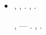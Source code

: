 \documentclass[a4paper]{article}
\begin{document}
\begin{itemize}
{{\cyrp}{\cyri}{\cyrk}{\cyrs}{\cyre}{\cyrl}{\cyrsftsn}}
\item {
{\CYRE}{\cyrs}{\cyrl}{\cyri} {\cyrp}{\cyro}{\cyrm}{\cyre}{\cyrch}{\cyre}{\cyrn} {\cyri}
{\cyrl}{\cyre}{\cyrv}{\cyrery}{\cyrishrt} {\cyri} {\cyrv}{\cyre}{\cyrr}{\cyrh}{\cyrn}{\cyri}{\cyrishrt}
{\cyrp}{\cyri}{\cyrk}{\cyrs}{\cyre}{\cyrl}{\cyrsftsn}, {\cyrt}{\cyro}
{\cyrt}{\cyre}{\cyrk}{\cyru}{\cyrshch}{\cyri}{\cyrishrt} {\cyrp}{\cyri}{\cyrk}{\cyrs}{\cyre}{\cyrl}{\cyrsftsn}
{\cyrp}{\cyro}{\cyrm}{\cyre}{\cyrch}{\cyra}{\cyre}{\cyrt}{\cyrs}{\cyrya} {\cyrt}{\cyro}{\cyrishrt} {\cyrzh}{\cyre}
{\cyrm}{\cyre}{\cyrt}{\cyrk}{\cyro}{\cyrishrt}, {\cyrch}{\cyrt}{\cyro} {\cyri}
{\cyrv}{\cyre}{\cyrr}{\cyrh}{\cyrn}{\cyri}{\cyrishrt} {\cyrp}{\cyri}{\cyrk}{\cyrs}{\cyre}{\cyrl}{\cyrsftsn}.
{\CYRL}{\cyre}{\cyrv}{\cyrery}{\cyrishrt} {\cyri} {\cyrv}{\cyre}{\cyrr}{\cyrh}{\cyrn}{\cyri}{\cyrishrt}
{\cyrp}{\cyri}{\cyrk}{\cyrs}{\cyre}{\cyrl}{\cyrsftsn} {\cyrz}{\cyra}{\cyrn}{\cyro}{\cyrs}{\cyrya}{\cyrt}{\cyrs}{\cyrya}
{\cyrv} {\cyrt}{\cyra}{\cyrb}{\cyrl}{\cyri}{\cyrc}{\cyru}
{\cyrerev}{\cyrk}{\cyrv}{\cyri}{\cyrv}{\cyra}{\cyrl}{\cyre}{\cyrn}{\cyrt}{\cyrn}{\cyro}{\cyrs}{\cyrt}{\cyri},
{\cyro}{\cyrn}{\cyra} {\cyrp}{\cyro}{\cyrn}{\cyra}{\cyrd}{\cyro}{\cyrb}{\cyri}{\cyrt}{\cyrs}{\cyrya} {\cyrn}{\cyra}
{\cyrs}{\cyrl}{\cyre}{\cyrd}{\cyru}{\cyryu}{\cyrshch}{\cyre}{\cyrm} {\cyrsh}{\cyra}{\cyrg}{\cyre}. }

{
{\CYRD}{\cyra}{\cyrl}{\cyre}{\cyre}, {\cyrs}{\cyrl}{\cyre}{\cyrd}{\cyru}{\cyre}{\cyrt}
{\cyrv}{\cyrt}{\cyro}{\cyrr}{\cyra}{\cyrya} {\cyrp}{\cyrr}{\cyro}{\cyrh}{\cyro}{\cyrd}{\cyrk}{\cyra} {\cyrp}{\cyro}
{\cyri}{\cyrz}{\cyro}{\cyrb}{\cyrr}{\cyra}{\cyrzh}{\cyre}{\cyrn}{\cyri}{\cyryu} ---
{\cyrp}{\cyrr}{\cyri}{\cyrm}{\cyre}{\cyrn}{\cyrya}{\cyre}{\cyrt}{\cyrs}{\cyrya}
{\cyrt}{\cyra}{\cyrb}{\cyrl}{\cyri}{\cyrc}{\cyra}
{\cyrerev}{\cyrk}{\cyrv}{\cyri}{\cyrv}{\cyra}{\cyrl}{\cyre}{\cyrn}{\cyrt}{\cyrn}{\cyro}{\cyrs}{\cyrt}{\cyri}.
{\CYRV}{\cyro} {\cyrv}{\cyrr}{\cyre}{\cyrm}{\cyrya} {\cyrerev}{\cyrt}{\cyro}{\cyrishrt}
{\cyrp}{\cyrr}{\cyro}{\cyrh}{\cyro}{\cyrd}{\cyrk}{\cyri}, {\cyrv}{\cyrs}{\cyre}
{\cyrs}{\cyro}{\cyro}{\cyrt}{\cyrv}{\cyre}{\cyrt}{\cyrs}{\cyrt}{\cyrv}{\cyru}{\cyryu}{\cyrshch}{\cyri}{\cyre}
{\cyrm}{\cyre}{\cyrt}{\cyrk}{\cyri} {\cyri}{\cyrz} {\cyrt}{\cyra}{\cyrb}{\cyrl}{\cyri}{\cyrc}{\cyrery}
{\cyrerev}{\cyrk}{\cyrv}{\cyri}{\cyrv}{\cyra}{\cyrl}{\cyre}{\cyrn}{\cyrt}{\cyrn}{\cyro}{\cyrs}{\cyrt}{\cyri}
{\cyrs}{\cyrt}{\cyra}{\cyrn}{\cyro}{\cyrv}{\cyrya}{\cyrt}{\cyrs}{\cyrya}
{\cyrp}{\cyro}{\cyrm}{\cyre}{\cyrch}{\cyre}{\cyrn}{\cyrn}{\cyrery}{\cyrm}{\cyri}
{\cyro}{\cyrd}{\cyri}{\cyrn}{\cyra}{\cyrk}{\cyro}{\cyrv}{\cyro}. }
\end{itemize}
\end{document}
